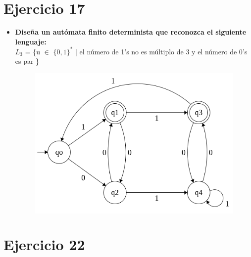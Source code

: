 \section{Ejercicio 17}
\begin{itemize}
	\item \textbf{Diseña un autómata finito determinista que reconozca el siguiente \\ lenguaje:} \\
	$L_{3}$ = \{u $\in$ $\{0,1\}^{*}$ | el número de 1's no es múltiplo de 3 y el número de 0's es par \} \\	
	
	\begin{figure}[h]
		\centering
		\includegraphics[scale=0.5]{AF.png}
	\end{figure}

\end{itemize} 





\section{Ejercicio 22}

